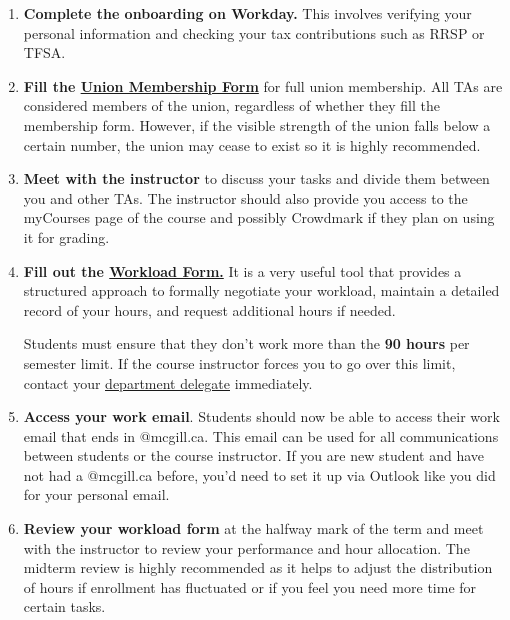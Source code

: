 \begin{enumerate}
    \item \textbf{Complete the onboarding on Workday.} This involves verifying your personal information and checking your tax contributions such as RRSP or TFSA. \\

    \item \textbf{Fill the \href{https://tsum-stsem.ca/members/membership-forms/}{Union Membership Form}} for full union membership. All TAs are considered members of the union, regardless of whether they fill the membership form. However, if the visible strength of the union falls below a certain number, the union may cease to exist so it is highly recommended.\\

    \item \textbf{Meet with the instructor} to discuss your tasks and divide them between you and other TAs. The instructor should also provide you access to the myCourses page of the course and possibly Crowdmark if they plan on using it for grading. \\

    \item \textbf{Fill out the \href{https://www.mcgill.ca/hr/files/hr/agsem_ta_workload_form_en-fillable.pdf}{Workload Form.}} It is a very useful tool that provides a structured approach to
    formally negotiate your workload, maintain a detailed record of your hours, and request additional hours if needed. 

    \begin{plainbox}
        Students must ensure that they don't work more than the \textbf{90 hours} per semester limit. If the course instructor forces you to go over this limit, contact your \href{https://tsum-stsem.ca/contact/}{ \underline{department delegate}} immediately. 
    \end{plainbox}

    \item \textbf{Access your work email}. Students should now be able to access their work email that ends in @mcgill.ca. This email can be used for all communications between students or the course instructor. If you are new student and have not had a @mcgill.ca before, you'd need to set it up via Outlook like you did for your personal email. \\

    \item \textbf{Review your workload form} at the halfway mark of the term and meet with the instructor to review your performance and hour allocation. The midterm review is highly recommended as it helps to adjust the distribution of hours if enrollment has fluctuated or if you feel you need more time for certain tasks. \\
\end{enumerate}



